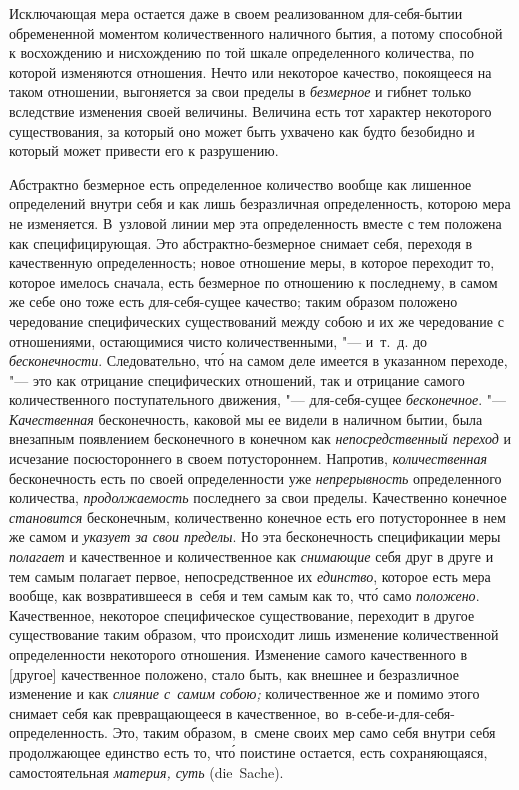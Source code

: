 
Исключающая мера остается даже в своем реализованном для-себя-бытии
обремененной моментом количественного наличного бытия, а потому способной к
восхождению и нисхождению по той шкале определенного количества, по которой
изменяются отношения. Нечто или некоторое качество, покоящееся на таком
отношении, выгоняется за свои пределы в {\em безмерное} и гибнет только
вследствие изменения своей величины. Величина есть тот характер некоторого
существования, за который оно может быть ухвачено как будто безобидно и который
может привести его к разрушению.

Абстрактно безмерное есть определенное количество вообще как лишенное
определений внутри себя и как лишь безразличная определенность, которою мера не
изменяется. В~узловой линии мер эта определенность вместе с тем положена как
специфицирующая. Это абстрактно-безмерное снимает себя, переходя в качественную
определенность; новое отношение меры, в которое переходит то, которое имелось
сначала, есть безмерное по отношению к последнему, в самом же себе оно тоже
есть для-себя-сущее качество; таким образом положено чередование специфических
существований между собою и их же чередование с отношениями, остающимися чисто
количественными, "--- и~т.~д. до {\em бесконечности}. Следовательно, чт\'{о} на
самом деле имеется в указанном переходе, "--- это как отрицание специфических
отношений, так и отрицание самого количественного поступательного движения,
"--- для-себя-сущее {\em бесконечное}. "--- {\em Качественная} бесконечность,
каковой мы ее видели в наличном бытии, была внезапным появлением бесконечного в
конечном как {\em непосредственный переход} и исчезание посюстороннего в своем
потустороннем. Напротив, {\em количественная} бесконечность есть по своей
определенности уже {\em непрерывность} определенного количества,
{\em продолжаемость} последнего за свои пределы. Качественно конечное
{\em становится} бесконечным, количественно конечное есть его потустороннее в
нем же самом и {\em указует за свои пределы}. Но эта бесконечность спецификации
меры {\em полагает} и качественное и количественное как {\em снимающие} себя
друг в друге и тем самым полагает первое, непосредственное их {\em единство},
которое есть мера вообще, как возвратившееся в~себя и тем самым как то, чт\'{о}
само {\em положено}. Качественное, некоторое специфическое существование,
переходит в другое существование таким образом, что происходит лишь изменение
количественной определенности некоторого отношения. Изменение самого
качественного в [другое] качественное положено, стало быть, как внешнее и
безразличное изменение и как {\em слияние с~самим собою;} количественное же и
помимо этого снимает себя как превращающееся в качественное,
во~в-себе-и-для-себя-определенность. Это, таким образом, в~смене своих мер само
себя внутри себя продолжающее единство есть то, чт\'{о} поистине остается, есть
сохраняющаяся, самостоятельная {\em материя, суть} (die~Sache).

